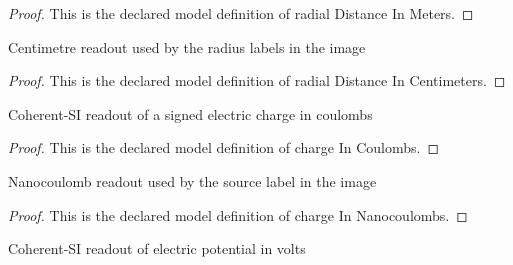 \begin{proof}
  This is the declared model definition of radial Distance In Meters.
\end{proof}
\begin{definition}
  \label{def:physics:phyx-mini-0857:phyxminiproblems-problemphyxmini0857-radialdistanceincentimeters}
  Centimetre readout used by the radius labels in the image
\end{definition}
\begin{proof}
  This is the declared model definition of radial Distance In Centimeters.
\end{proof}
\begin{definition}
  \label{def:physics:phyx-mini-0857:phyxminiproblems-problemphyxmini0857-chargeincoulombs}
  Coherent-SI readout of a signed electric charge in coulombs
\end{definition}
\begin{proof}
  This is the declared model definition of charge In Coulombs.
\end{proof}
\begin{definition}
  \label{def:physics:phyx-mini-0857:phyxminiproblems-problemphyxmini0857-chargeinnanocoulombs}
  Nanocoulomb readout used by the source label in the image
\end{definition}
\begin{proof}
  This is the declared model definition of charge In Nanocoulombs.
\end{proof}
\begin{definition}
  \label{def:physics:phyx-mini-0857:phyxminiproblems-problemphyxmini0857-electricpotentialinvolts}
  Coherent-SI readout of electric potential in volts
\end{definition}
